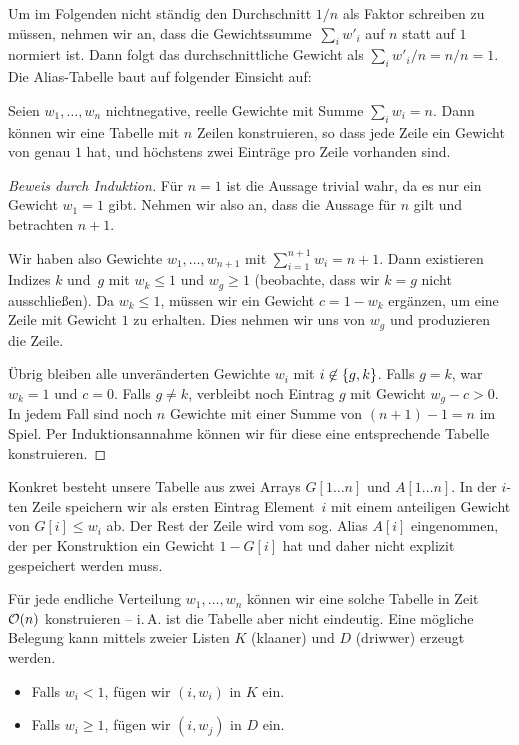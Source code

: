 Um im Folgenden nicht ständig den Durchschnitt $1/n$ als Faktor schreiben zu müssen, nehmen wir an, dass die Gewichtssumme~$\sum_i w'_i$ auf $n$ statt auf $1$ normiert ist.
Dann folgt das durchschnittliche Gewicht als $\sum_i w'_i / n = n /n = 1$.
Die Alias-Tabelle baut auf folgender Einsicht auf:

\begin{theorem}
    Seien $w_1, \ldots, w_n$ nichtnegative, reelle Gewichte mit Summe $\sum_i w_i = n$.
    Dann können wir eine Tabelle mit $n$ Zeilen konstruieren, so dass jede Zeile ein Gewicht von genau $1$ hat, und höchstens zwei Einträge pro Zeile vorhanden sind.
\end{theorem}

\begin{proof}[Beweis durch Induktion]
    Für $n=1$ ist die Aussage trivial wahr, da es nur ein Gewicht $w_1 = 1$ gibt.
    Nehmen wir also an, dass die Aussage für $n$ gilt und betrachten $n + 1$.

    Wir haben also Gewichte $w_1, \ldots, w_{n+1}$ mit $\sum_{i=1}^{n+1} w_i = n + 1$.
    Dann existieren Indizes $k$ und~$g$ mit $w_k \le 1$ und $w_g \ge 1$ (beobachte, dass wir $k = g$ nicht ausschließen).
    Da $w_k \le 1$, müssen wir ein Gewicht $c = 1 - w_k$ ergänzen, um eine Zeile mit Gewicht $1$ zu erhalten.
    Dies nehmen wir uns von $w_g$ und produzieren die Zeile.

    Übrig bleiben alle unveränderten Gewichte $w_i$ mit $i \not\in \left\{g, k\right\}$.
    Falls $g = k$, war $w_k = 1$ und $c=0$.
    Falls $g \ne k$, verbleibt noch Eintrag $g$ mit Gewicht $w_g - c > 0$.
    In jedem Fall sind noch $n$ Gewichte mit einer Summe von $(n+1) - 1 = n$ im Spiel.
    Per Induktionsannahme können wir für diese eine entsprechende Tabelle konstruieren.
\end{proof}

Konkret besteht unsere Tabelle aus zwei Arrays $G[1\ldots n]$ und $A[1\ldots n]$.
In der $i$-ten Zeile speichern wir als ersten Eintrag Element~$i$ mit einem anteiligen Gewicht von $G[i] \le w_i$ ab.
Der Rest der Zeile wird vom sog. Alias $A[i]$ eingenommen, der per Konstruktion ein Gewicht $1 - G[i]$ hat und daher nicht explizit gespeichert werden muss.

Für jede endliche Verteilung $w_1, \ldots, w_n$ können wir eine solche Tabelle in Zeit $\mathcal{O}\!\left(n\right)$ konstruieren -- i.\,A. ist die Tabelle aber nicht eindeutig.
Eine mögliche Belegung kann mittels zweier Listen $K$ (klaaner) und $D$ (driwwer) erzeugt werden.
\begin{itemize}
    \item Falls $w_i < 1$, fügen wir $(i, w_i)$ in $K$ ein.
    \item Falls $w_i \ge 1$, fügen wir $(i, w_j)$ in $D$ ein.
\end{itemize}

